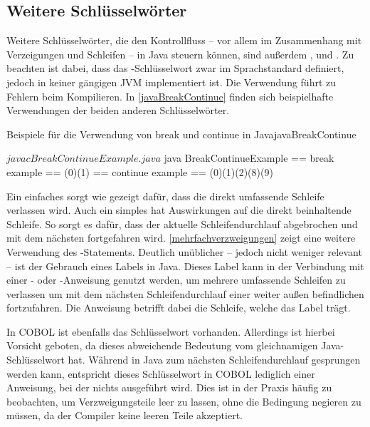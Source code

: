 \subsection{Weitere Schlüsselwörter}

Weitere Schlüsselwörter, die den Kontrollfluss -- vor allem im Zusammenhang mit Verzeigungen und Schleifen -- in Java steuern können, sind außerdem ,  und . Zu beachten ist dabei, dass das -Schlüsselwort zwar im Sprachstandard definiert, jedoch in keiner gängigen JVM implementiert ist. Die Verwendung führt zu Fehlern beim Kompilieren. In \autoref{javaBreakContinue} finden sich beispielhafte Verwendungen der beiden anderen Schlüsselwörter.

\begin{codeWithCaption}{Beispiele für die Verwendung von break und continue in Java}{javaBreakContinue}
\begin{shellwindow}
$ javac BreakContinueExample.java 
$ java BreakContinueExample
== break example == 
(0)(1)
== continue example == 
(0)(1)(2)(8)(9)
\end{shellwindow}
\end{codeWithCaption}

Ein einfaches  sorgt wie gezeigt dafür, dass die direkt umfassende Schleife verlassen wird. Auch ein simples  hat Auswirkungen auf die direkt beinhaltende Schleife. So sorgt es dafür, dass der aktuelle Schleifendurchlauf abgebrochen und mit dem nächsten fortgefahren wird. \autoref{mehrfachverzweigungen} zeigt eine weitere Verwendung des -Statements. Deutlich unüblicher -- jedoch nicht weniger relevant -- ist der Gebrauch eines Labels in Java. Dieses Label kann in der Verbindung mit einer - oder -Anweisung genutzt werden, um mehrere umfassende Schleifen zu verlassen \bzw um mit dem nächsten Schleifendurchlauf einer weiter außen befindlichen fortzufahren. Die Anweisung betrifft dabei die Schleife, welche das Label trägt. 

In COBOL ist ebenfalls das Schlüsselwort  vorhanden. Allerdings ist hierbei Vorsicht geboten, da dieses abweichende Bedeutung vom gleichnamigen Java-Schlüsselwort hat. Während in Java zum nächsten Schleifendurchlauf gesprungen werden kann, entspricht dieses Schlüsselwort in COBOL lediglich einer Anweisung, bei der nichts ausgeführt wird. Dies ist in der Praxis häufig zu beobachten, um \zB Verzweigungsteile leer zu lassen, ohne die Bedingung negieren zu müssen, da der Compiler keine leeren Teile akzeptiert.

